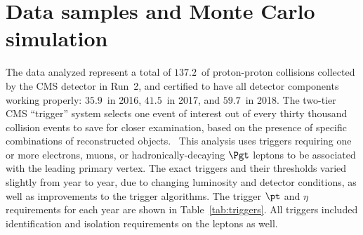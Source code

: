\section{Data samples and Monte Carlo simulation}
\label{sec:datasets}

The data analyzed represent a total of $137.2$~\fbinv of proton-proton collisions
collected by the CMS detector in Run~2, and certified to have all detector components
working properly: $35.9$~\fbinv in 2016, $41.5$~\fbinv in 2017, and $59.7$~\fbinv in 2018.
The two-tier CMS ``trigger'' system selects one event of interest out of every thirty
thousand collision events to save for closer examination, based on the presence of
specific combinations of reconstructed objects.~\cite{CMS_trigger}  This analysis
uses triggers requiring one or more electrons, muons, or hadronically-decaying $\Pgt$
leptons to be associated with the leading primary vertex. The exact triggers and their
thresholds varied slightly from year to year, due to changing luminosity and detector
conditions, as well as improvements to the trigger algorithms.  The trigger $\pt$ and
$\eta$ requirements for each year are shown in Table~\ref{tab:triggers}.  All
triggers included identification and isolation requirements on the leptons as well.


